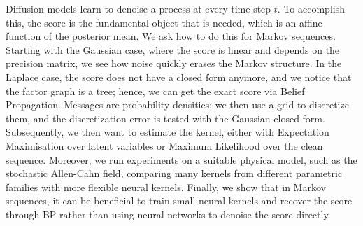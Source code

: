 
Diffusion models learn to denoise a process at every time step $t$. To accomplish this, the score is the fundamental object that is needed, which is an affine function of the posterior mean. We ask how to do this for Markov sequences. Starting with the Gaussian case, where the score is linear and depends on the precision matrix, we see how noise quickly erases the Markov structure. In the Laplace case, the score does not have a closed form anymore, and we notice that the factor graph is a tree; hence, we can get the exact score via Belief Propagation. Messages are probability densities; we then use a grid to discretize them, and the discretization error is tested with the Gaussian closed form. Subsequently, we then want to estimate the kernel, either with Expectation Maximisation over latent variables or Maximum Likelihood over the clean sequence. Moreover, we run experiments on a suitable physical model, such as the stochastic Allen-Cahn field, comparing many kernels from different parametric families with more flexible neural kernels. Finally, we show that in Markov sequences, it can be beneficial to train small neural kernels and recover the score through BP rather than using neural networks to denoise the score directly.
